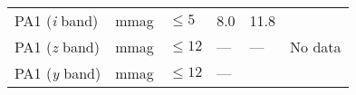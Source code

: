 \documentclass[DM,toc]{lsstdoc}
\begin{document}
\begin{longtable}[]{@{}llllll@{}}
\begin{minipage}[t]{0.14\columnwidth}
PA1 (\emph{i} band)\strut
\end{minipage} & \begin{minipage}[t]{0.06\columnwidth}\raggedright\strut
mmag\strut
\end{minipage} & \begin{minipage}[t]{0.17\columnwidth}\raggedright\strut
\(\leq 5\)\strut
\end{minipage} & \begin{minipage}[t]{0.17\columnwidth}\raggedright\strut
8.0\strut
\end{minipage} & \begin{minipage}[t]{0.12\columnwidth}\raggedright\strut
11.8\strut
\end{minipage} & \begin{minipage}[t]{0.17\columnwidth}\raggedright\strut
\strut
\end{minipage}\tabularnewline
\begin{minipage}[t]{0.14\columnwidth}\raggedright\strut
PA1 (\emph{z} band)\strut
\end{minipage} & \begin{minipage}[t]{0.06\columnwidth}\raggedright\strut
mmag\strut
\end{minipage} & \begin{minipage}[t]{0.17\columnwidth}\raggedright\strut
\(\leq 12\)\strut
\end{minipage} & \begin{minipage}[t]{0.17\columnwidth}\raggedright\strut
---\strut
\end{minipage} & \begin{minipage}[t]{0.12\columnwidth}\raggedright\strut
---\strut
\end{minipage} & \begin{minipage}[t]{0.17\columnwidth}\raggedright\strut
No data\strut
\end{minipage}\tabularnewline
\begin{minipage}[t]{0.14\columnwidth}\raggedright\strut
PA1 (\emph{y} band)\strut
\end{minipage} & \begin{minipage}[t]{0.06\columnwidth}\raggedright\strut
mmag\strut
\end{minipage} & \begin{minipage}[t]{0.17\columnwidth}\raggedright\strut
\(\leq 12\)\strut
\end{minipage} & \begin{minipage}[t]{0.17\columnwidth}\raggedright\strut
---\strut
\end{minipage} & \begin{minipage}[t]{0.12\columnwidth}\raggedright\strut

\end{minipage}
\end{longtable}
\end{document}
